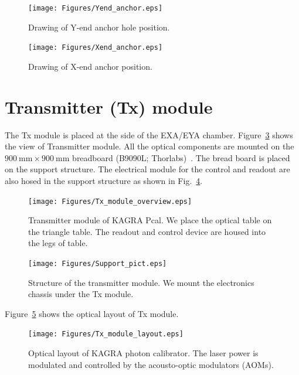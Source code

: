 \begin{figure}
\begin{center}
\texttt{[image: Figures/Yend\_anchor.eps]}
\caption{Drawing of Y-end anchor hole position.} 
\label{fig:Yend_anchor} 
\end{center}
\end{figure}

\begin{figure}
\begin{center}
\texttt{[image: Figures/Xend\_anchor.eps]}
\caption{Drawing of X-end anchor position.} 
\label{fig:Xend_anchor} 
\end{center}
\end{figure}


\section{Transmitter (Tx) module}
The Tx module is placed at the side of the EXA/EYA chamber. Figure~\ref{fig:Tx_module_overview} shows the view of Transmitter module. All the optical components are mounted on the $900~\mathrm{mm}\times  900~\mathrm{mm}$ breadboard (B9090L; Thorlabs)~\cite{Thorlabs}. The bread board is placed on the support structure. The electrical module for the control and readout are also hosed in the support structure as shown in Fig.~\ref{fig:Support_pict}. 

\begin{figure}
\begin{center}
\texttt{[image: Figures/Tx\_module\_overview.eps]}
\caption{Transmitter module of KAGRA Pcal. We place the optical table on the triangle table. The readout and control device are housed into the legs of table.} 
\label{fig:Tx_module_overview} 
\end{center}
\end{figure}

\begin{figure}
\begin{center}
\texttt{[image: Figures/Support\_pict.eps]}
\caption{Structure of the transmitter module. We mount the electronics chassis under the Tx module.} 
\label{fig:Support_pict} 
\end{center}
\end{figure}


Figure~\ref{fig:Tx_module_layout} shows the optical layout of Tx module.

\begin{figure}
\begin{center}
\texttt{[image: Figures/Tx\_module\_layout.eps]}
\caption{Optical layout of KAGRA photon calibrator. The laser power is modulated and controlled by the acousto-optic modulators (AOMs).} 
\label{fig:Tx_module_layout} 
\end{center}
\end{figure}

